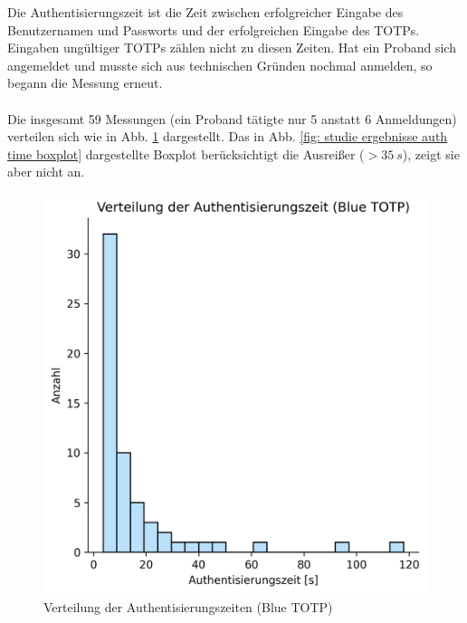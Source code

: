 Die Authentisierungszeit ist die Zeit zwischen erfolgreicher Eingabe des 
Benutzernamen und Passworts und der erfolgreichen Eingabe des TOTPs. Eingaben 
ungültiger TOTPs zählen nicht zu diesen Zeiten. Hat ein Proband sich angemeldet und 
musste sich aus technischen Gründen nochmal anmelden, so begann die Messung erneut.
\\\\
Die insgesamt 59 Messungen (ein Proband tätigte nur 5 anstatt 6 Anmeldungen) 
verteilen sich wie in Abb. \ref{fig: studie ergebnisse auth time dist} dargestellt. 
Das in Abb. \ref{fig: studie ergebnisse auth time boxplot} dargestellte Boxplot 
berücksichtigt die Ausreißer ($> 35~s$), zeigt sie aber nicht an.
\begin{figure}
    \begin{minipage}[t]{.48\textwidth}
        \centering
        \includegraphics[width=1\linewidth]{data_processing/timings/results/distribution_of_data.png}
        \caption[Verteilung der Authentisierungszeiten (Blue TOTP)]{Verteilung der Authentisierungszeiten (Blue TOTP)}
        \label{fig: studie ergebnisse auth time dist}
    \end{minipage}
    \hfill
    \begin{minipage}[t]{.48\textwidth}
        \centering

\end{minipage}
\end{figure}
